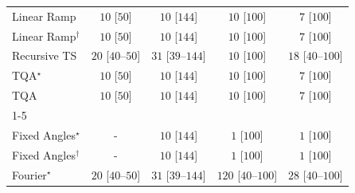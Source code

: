 \begin{tabular}{l|cccc|}
Linear Ramp & {\cellcolor[HTML]{F6FCF4}} \color[HTML]{000000} $10$ [$50$] & {\cellcolor[HTML]{F6FCF4}} \color[HTML]{000000} $10$ [$144$] & {\cellcolor[HTML]{F6FCF4}} \color[HTML]{000000} $10$ [$100$] & {\cellcolor[HTML]{F6FCF4}} \color[HTML]{000000} $7$ [$100$] \\
Linear Ramp$^\dagger$ & {\cellcolor[HTML]{F6FCF4}} \color[HTML]{000000} $10$ [$50$] & {\cellcolor[HTML]{F6FCF4}} \color[HTML]{000000} $10$ [$144$] & {\cellcolor[HTML]{F6FCF4}} \color[HTML]{000000} $10$ [$100$] & {\cellcolor[HTML]{F6FCF4}} \color[HTML]{000000} $7$ [$100$] \\
Recursive TS & {\cellcolor[HTML]{F4FBF1}} \color[HTML]{000000} $20$ [$40$--$50$] & {\cellcolor[HTML]{F2FAEF}} \color[HTML]{000000} $31$ [$39$--$144$] & {\cellcolor[HTML]{F6FCF4}} \color[HTML]{000000} $10$ [$100$] & {\cellcolor[HTML]{F4FBF2}} \color[HTML]{000000} $18$ [$40$--$100$] \\
TQA$^\star$ & {\cellcolor[HTML]{F6FCF4}} \color[HTML]{000000} $10$ [$50$] & {\cellcolor[HTML]{F6FCF4}} \color[HTML]{000000} $10$ [$144$] & {\cellcolor[HTML]{F6FCF4}} \color[HTML]{000000} $10$ [$100$] & {\cellcolor[HTML]{F6FCF4}} \color[HTML]{000000} $7$ [$100$] \\
TQA & {\cellcolor[HTML]{F6FCF4}} \color[HTML]{000000} $10$ [$50$] & {\cellcolor[HTML]{F6FCF4}} \color[HTML]{000000} $10$ [$144$] & {\cellcolor[HTML]{F6FCF4}} \color[HTML]{000000} $10$ [$100$] & {\cellcolor[HTML]{F6FCF4}} \color[HTML]{000000} $7$ [$100$] \\
\cline{1-5}
\multicolumn{5}{c}{\rule{0pt}{8pt}PP} \\
\midrule
Fixed Angles$^\star$ & {\cellcolor[HTML]{000000}} \color[HTML]{F1F1F1} {\cellcolor{white}} \color{black} - & {\cellcolor[HTML]{F6FCF4}} \color[HTML]{000000} $10$ [$144$] & {\cellcolor[HTML]{F7FCF5}} \color[HTML]{000000} $1$ [$100$] & {\cellcolor[HTML]{F7FCF5}} \color[HTML]{000000} $1$ [$100$] \\
Fixed Angles$^\dagger$ & {\cellcolor[HTML]{000000}} \color[HTML]{F1F1F1} {\cellcolor{white}} \color{black} - & {\cellcolor[HTML]{F6FCF4}} \color[HTML]{000000} $10$ [$144$] & {\cellcolor[HTML]{F7FCF5}} \color[HTML]{000000} $1$ [$100$] & {\cellcolor[HTML]{F7FCF5}} \color[HTML]{000000} $1$ [$100$] \\
Fourier$^\star$ & {\cellcolor[HTML]{F4FBF1}} \color[HTML]{000000} $20$ [$40$--$50$] & {\cellcolor[HTML]{F2FAEF}} \color[HTML]{000000} $31$ [$39$--$144$] & {\cellcolor[HTML]{DEF2D9}} \color[HTML]{000000} $120$ [$40$--$100$] & {\cellcolor[HTML]{F2FAF0}} \color[HTML]{000000} $28$ [$40$--$100$] \\

\end{tabular}
